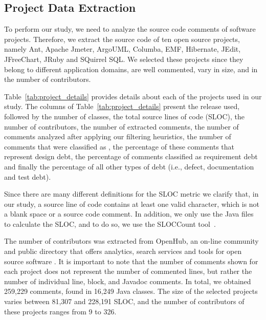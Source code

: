 \subsection{Project Data Extraction} %
\label{sub:data_extraction}

To perform our study, we need to analyze the source code comments of software projects. Therefore, we extract the source code of ten open source projects, namely Ant, Apache Jmeter, ArgoUML, Columba, EMF, Hibernate, JEdit, JFreeChart, JRuby and SQuirrel SQL. We selected these projects since they belong to different application domains, are well commented, vary in size, and in the number of contributors. 

Table~\ref{tab:project_details} provides details about each of the projects used in our study. The columns of Table~\ref{tab:project_details} present the release used, followed by the number of classes, the total source lines of code (SLOC), the number of contributors, the number of extracted comments, the number of comments analyzed after applying our filtering heuristics, the number of comments that were classified as \SATD, the percentage of these comments that represent design debt, the percentage of \SATD comments classified as requirement debt and finally the percentage of all other types of debt (i.e., defect, documentation and test debt). 

Since there are many different definitions for the SLOC metric we clarify that, in our study, a source line of code contains at least one valid character, which is not a blank space or a source code comment. In addition, we only use the Java files to calculate the SLOC, and to do so, we use the SLOCCount tool~\cite{wheeler2004:home}. 

The number of contributors was extracted from OpenHub, an on-line community and public directory that offers analytics, search services and tools for open source software \cite{Openhub:home}. It is important to note that the number of comments shown for each project does not represent the number of commented lines, but rather the number of individual line, block, and Javadoc comments. In total, we obtained 259,229 comments, found in 16,249 Java classes. The size of the selected projects varies between 81,307 and 228,191 SLOC, and the number of contributors of these projects ranges from 9 to 326. 


